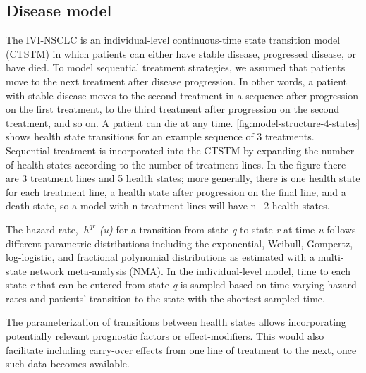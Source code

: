 \documentclass[11pt,final,fleqn]{article}\usepackage[]{graphicx}\usepackage[]{color}
\theoremstyle{plain}
\begin{document}
{\subsection{Disease model}
The IVI-NSCLC is an individual-level continuous-time state transition model (CTSTM) in which patients can either have stable disease, progressed disease, or have died. To model sequential treatment strategies, we assumed that patients move to the next treatment after disease progression. In other words, a patient with stable disease moves to the second treatment in a sequence after progression on the first treatment, to the third treatment after progression on the second treatment, and so on. A patient can die at any time. \autoref{fig:model-structure-4-states} shows health state transitions for an example sequence of 3 treatments. Sequential treatment is incorporated into the CTSTM by expanding the number of health states according to the number of treatment lines. In the figure there are 3 treatment lines and 5 health states; more generally, there is one health state for each treatment line, a health state after progression on the final line, and a death state, so a model with n treatment lines will have n+2 health states. 

The hazard rate, $\ h^{qr} $ \textit{(u)} for a transition from state \textit{q} to state \textit{r} at time \textit{u} follows different parametric distributions including the exponential, Weibull, Gompertz, log-logistic, and fractional polynomial distributions as estimated with a multi-state network meta-analysis (NMA). In the individual-level model, time to each state \textit{r} that can be entered from state \textit{q} is sampled based on time-varying hazard rates and patients' transition to the state with the shortest sampled time.

The parameterization of transitions between health states allows incorporating potentially relevant prognostic factors or effect-modifiers. This would also facilitate including carry-over effects from one line of treatment to the next, once such data becomes available. 

}
\end{document}
